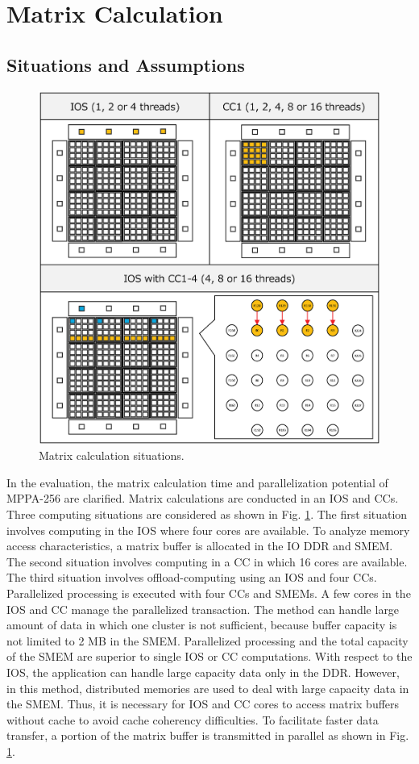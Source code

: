 \clearpage

\section{Matrix Calculation}
\label{sec:martix_eval}

\subsection{Situations and Assumptions}
\label{sec:situations_and_assumptions1}

\begin{figure}[H]
  \centering
  \includegraphics[width=0.5\linewidth]{../figure/matrix_calculation.eps}
  \caption{\label{fig:mat_calc}
    Matrix calculation situations.}
\end{figure}

In the evaluation, the matrix calculation time and parallelization potential of MPPA-256 are clarified.
Matrix calculations are conducted in an IOS and CCs.
Three computing situations are considered as shown in Fig. \ref{fig:mat_calc}.
The first situation involves computing in the IOS where four cores are available.
To analyze memory access characteristics, a matrix buffer is allocated in the IO DDR and SMEM.
The second situation involves computing in a CC in which 16 cores are available.
The third situation involves offload-computing using an IOS and four CCs.
Parallelized processing is executed with four CCs and SMEMs.
A few cores in the IOS and CC manage the parallelized transaction.
The method can handle large amount of data in which one cluster is not sufficient, because buffer capacity is not limited to 2 MB in the SMEM.
Parallelized processing and the total capacity of the SMEM are superior to single IOS or CC computations. 
With respect to the IOS, the application can handle large capacity data only in the DDR.
However, in this method, distributed memories are used to deal with large capacity data in the SMEM.
Thus, it is necessary for IOS and CC cores to access matrix buffers without cache to avoid cache coherency difficulties.
To facilitate faster data transfer, a portion of the matrix buffer is transmitted in parallel as shown in Fig. \ref{fig:mat_calc}.


